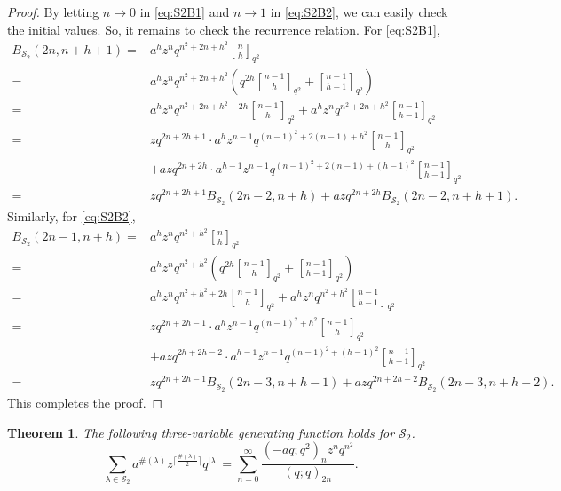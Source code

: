 \documentclass[11pt]{amsart}
\newtheorem{theorem}{Theorem}[section]
\theoremstyle{definition}
\theoremstyle{remark}
\numberwithin{equation}{section}
\begin{document}
\begin{proof}
By letting $n\to0$ in \eqref{eq:S2B1} and $n\to1$ in \eqref{eq:S2B2}, we can easily check the initial values. So, it remains to check the recurrence relation. For \eqref{eq:S2B1},
\begin{align*}
B_{\mathcal S_2}(2n,n+h+1)=&a^hz^nq^{n^2+2n+h^2}{n\brack h}_{q^2}\\
=&a^hz^nq^{n^2+2n+h^2}\left(q^{2h}{n-1\brack h}_{q^2}+{n-1\brack{h-1}}_{q^2}\right)\\
=&a^hz^nq^{n^2+2n+h^2+2h}{n-1\brack h}_{q^2}+a^hz^nq^{n^2+2n+h^2}{n-1\brack{h-1}}_{q^2}\\
=&zq^{2n+2h+1}\cdot a^{h}z^{n-1}q^{(n-1)^2+2(n-1)+h^2}{n-1\brack h}_{q^2}\\
&+azq^{2n+2h}\cdot a^{h-1}z^{n-1}q^{(n-1)^2+2(n-1)+(h-1)^2}{n-1\brack{h-1}}_{q^2}\\
=&zq^{2n+2h+1}B_{\mathcal S_2}(2n-2,n+h)+azq^{2n+2h}B_{\mathcal S_2}(2n-2,n+h+1).
\end{align*}
Similarly, for \eqref{eq:S2B2},
\begin{align*}
B_{\mathcal S_2}(2n-1,n+h)=&a^hz^nq^{n^2+h^2}{n\brack h}_{q^2}\\
=&a^hz^nq^{n^2+h^2}\left(q^{2h}{n-1\brack h}_{q^2}+{n-1\brack h-1}_{q^2}\right)\\
=&a^hz^nq^{n^2+h^2+2h}{n-1\brack h}_{q^2}+a^hz^nq^{n^2+h^2}{n-1\brack h-1}_{q^2}\\
=&zq^{2n+2h-1}\cdot a^hz^{n-1}q^{(n-1)^2+h^2}{n-1\brack h}_{q^2}\\
&+azq^{2h+2h-2}\cdot a^{h-1}z^{n-1}q^{(n-1)^2+(h-1)^2}{n-1\brack h-1}_{q^2}\\
=&zq^{2n+2h-1}B_{\mathcal S_2}(2n-3,n+h-1)+azq^{2n+2h-2}B_{\mathcal S_2}(2n-3,n+h-2).
\end{align*}
This completes the proof.
\end{proof}

\begin{theorem}\label{thm:S2-gf}
The following three-variable generating function holds for $\mathcal{S}_2$.
\begin{equation}\label{eq:azS2}
\sum_{\lambda\in\mathcal{S}_2}a^{\overline{\#}(\lambda)}z^{\lceil\frac{\#(\lambda)}{2}\rceil}q^{|\lambda|}=\sum_{n=0}^{\infty}\frac{(-aq;q^2)_{n}z^nq^{n^2}}{(q;q)_{2n}}.
\end{equation}
\end{theorem}
\end{document}
